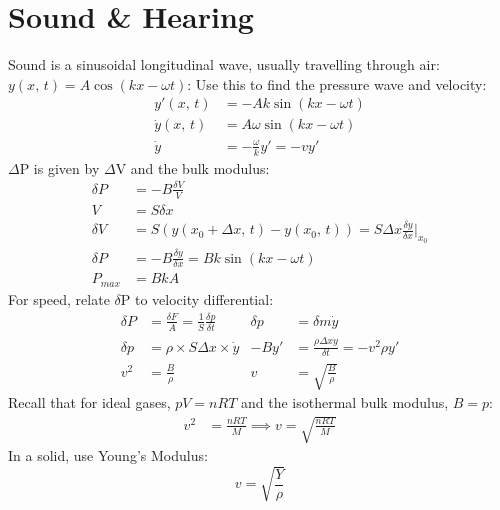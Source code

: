 \documentclass[a4paper, 11pt, normalem]{report}
\begin{document}
\section{Sound \& Hearing}
Sound is a sinusoidal longitudinal wave, usually travelling through air: $y(x,\,t) = A\cos{(kx - \omega t)}$:
Use this to find the pressure wave and velocity:
\begin{align}
    y'(x,\,t) &= -Ak\sin{(kx - \omega t)} \\
    \dot{y}(x,\,t) &= A\omega\sin{(kx - \omega t)} \\
    \dot{y} &= -\frac{\omega}{k}y' = -vy'
\end{align}
$\Delta$P is given by $\Delta$V and the bulk modulus:
\begin{align}
    \delta P &= -B\frac{\delta V}{V} \\
    V &= S\delta x \\
    \delta V &= S(y(x_{0} + \Delta x,\, t) - y(x_{0},\, t)) = S\Delta x \frac{\delta y}{\delta x}\Big|_{x_{0}} \\
    \delta P &= -B\frac{\delta y}{\delta x} = Bk\sin{(kx - \omega t)} \\
    P_{max} &= BkA
\end{align}
For speed, relate $\delta$P to velocity differential:
\begin{align}
    \delta P &= \frac{\delta F}{A} = \frac{1}{S}\frac{\delta p}{\delta t} & \delta p &= \delta m\dot{y} \\
    \delta p &= \rho\times S\Delta x\times\dot{y} & -By' &= \frac{\rho\Delta x\dot{y}}{\delta t} = -v^{2}\rho y' \\
    v^{2} &= \frac{B}{\rho} &  v &= \sqrt{\frac{B}{\rho}}
\end{align}
Recall that for ideal gases, $pV = nRT$ and the isothermal bulk modulus, $B = p$:
\begin{align}
    v^{2} &= \frac{nRT}{M} \implies v = \sqrt{\frac{nRT}{M}}
\end{align}
In a solid, use Young's Modulus:
\begin{equation}
    v = \sqrt{\frac{Y}{\rho}}
\end{equation}
\end{document}
